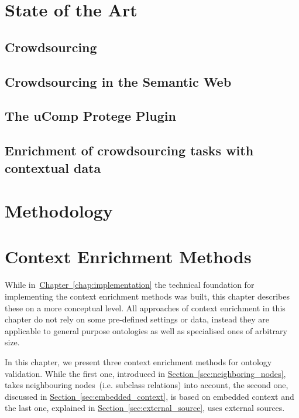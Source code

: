 \documentclass[draft,final]{vutinfth} %
\begin{document}
\chapter{State of the Art}\label{chap:state_of_the_art}
\section{Crowdsourcing}
\section{Crowdsourcing in the Semantic Web}
\section{The uComp Protege Plugin}\label{sec:ucomp_protege_plugin}
\section{Enrichment of crowdsourcing tasks with contextual data}



\chapter{Methodology}



\chapter{Context Enrichment Methods}\label{chap:context_enrichment_methods}
While in~\hyperref[chap:implementation]{Chapter~\ref*{chap:implementation}} the technical foundation for implementing the context enrichment methods was built, this chapter describes these on a more conceptual level. All approaches of context enrichment in this chapter do not rely on some pre-defined settings or data, instead they are applicable to general purpose ontologies as well as specialised ones of arbitrary size.

In this chapter, we present three context enrichment methods for ontology validation. While the first one, introduced in \hyperref[sec:neighboring_nodes]{Section~\ref*{sec:neighboring_nodes}}, takes neighbouring nodes~(i.e. subclass relations) into account, the second one, discussed in \hyperref[sec:embedded_context]{Section~\ref*{sec:embedded_context}}, is based on embedded context and the last one, explained in \hyperref[sec:external_source]{Section~\ref*{sec:external_source}}, uses external sources. 
\end{document}
